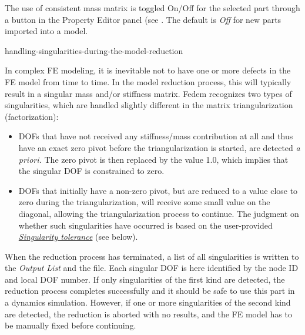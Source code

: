 {

The use of consistent mass matrix is toggled On/Off for the selected part
through a button in the Property Editor panel (see
.
The default is {\sl Off} for new parts imported into a model.


           {handling-singularities-during-the-model-reduction}

In complex FE modeling, it is inevitable not to have one or more defects in the
FE model from time to time. In the model reduction process, this will typically
result in a singular mass and/or stiffness matrix. Fedem recognizes two types of
singularities, which are handled slightly different in the matrix
triangularization (factorization):

\begin{itemize}
\item
  DOFs that have not received any stiffness/mass contribution at all and
  thus have an exact zero pivot before the triangularization is started,
  are detected {\sl a priori.} The zero pivot is then replaced by the value 1.0,
  which implies that the singular DOF is constrained to zero.
\item
  DOFs that initially have a non-zero pivot, but are reduced to a value
  close to zero during the triangularization, will receive some small
  value on the diagonal, allowing the triangularization process to continue.
  The judgment on whether such singularities have occurred is based on
  the user-provided \protect\hyperlink{singularity-tolerance}
  {\sl Singularity tolerance} (see below).
\end{itemize}

When the reduction process has terminated, a list of all singularities
is written to the {\sl Output List} and the  file.
Each singular DOF is here identified by the node ID and local DOF number.
If only singularities of the first kind are detected, the reduction process
completes successfully and it should be safe to use this part in a dynamics
simulation. However, if one or more singularities of the second kind are
detected, the reduction is aborted with no results, and the FE model has to be
manually fixed before continuing.

}
